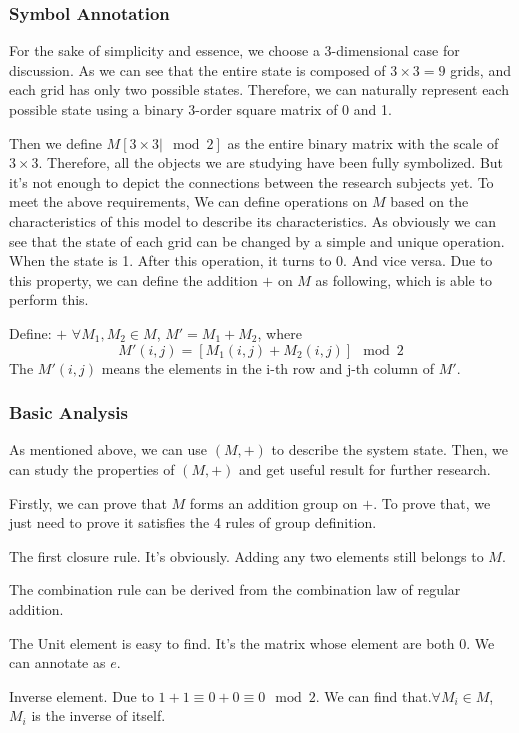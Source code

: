 \documentclass[
  manuscript=article,  %
  layout=preprint,  %
  year=20xx,
  volume=x,
]{extra/joas}
\begin{document}
\subsubsection{Symbol Annotation}
For the sake of simplicity and essence, we choose a 3-dimensional case for discussion.
As we can see that the entire state is composed of $3\times 3 = 9$ grids, 
and each grid has only two possible states. Therefore, we can naturally represent each possible 
state using a binary 3-order square matrix of 0 and 1.
\par Then we define $M[3\times 3 |\mod 2]$ as the entire binary matrix with the scale of $3 \times 3$.
Therefore, all the objects we are studying have been fully symbolized.
But it's not enough to depict the connections between the research subjects yet.
To meet the above requirements, 
We can define operations on $M$ based on the characteristics of this model to describe its characteristics.
As obviously we can see that the state of each grid can be changed by a simple and unique operation.
When the state is 1. After this operation, it turns to 0. And vice versa.
Due to this property, we can define the addition $+$ on $M$ as following, which is able to perform this.
\par Define: $+$ \quad $\forall M_1, M_2 \in M$,  $M' = M_1 + M_2$, where $$M'(i, j) = [M_1(i, j) + M_2(i, j)] \mod 2$$
The $M'(i, j)$ means the elements in the i-th row and j-th column of $M'$.


\subsubsection{Basic Analysis}
As mentioned above, we can use $(M, +)$ to describe the system state. Then, we can study the properties of $(M, +)$ and get useful
result for further research.

Firstly, we can prove that $M$ forms an addition group on $+$.
To prove that, we just need to prove it satisfies the 4 rules of group definition.
\par The first closure rule. It's obviously. Adding any two elements still belongs to $M$.
\par The combination rule can be derived from the combination law of regular addition.
\par The Unit element is easy to find. It's the matrix whose element are both 0. We can annotate as $e$.
\par Inverse element. Due to $1 + 1 \equiv 0 + 0 \equiv 0 \mod 2$. We can find that.$\forall M_i \in M$, $M_i$ is the inverse of itself.
\end{document}
